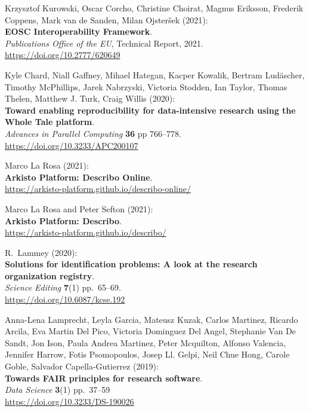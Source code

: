 Krzysztof Kurowski, Oscar Corcho, Christine Choirat, Magnus
Eriksson, Frederik Coppens, Mark van de Sanden, Milan Ojsteršek
(2021):\\
\textbf{EOSC Interoperability Framework}.\\
\emph{Publications Office of the EU}, Technical Report, 2021.\\
\url{https://doi.org/10.2777/620649}

Kyle Chard, Niall Gaffney, Mihael Hategan, Kacper Kowalik,
Bertram Ludäscher, Timothy McPhillips, Jarek Nabrzyski, Victoria
Stodden, Ian Taylor, Thomas Thelen, Matthew J. Turk, Craig Willis
(2020):\\
\textbf{Toward enabling reproducibility for data-intensive research
using the Whole Tale platform}.\\
\emph{Advances in Parallel Computing} \textbf{36} pp 766--778.\\
\url{https://doi.org/10.3233/APC200107}

Marco La Rosa (2021):\\
\textbf{Arkisto Platform: Describo Online}.\\
\url{https://arkisto-platform.github.io/describo-online/}

Marco La Rosa and Peter Sefton (2021):\\
\textbf{Arkisto Platform: Describo}.\\
\url{https://arkisto-platform.github.io/describo/}

R.~Lammey (2020):\\
\textbf{Solutions for identification problems: A look at the research
organization registry}.\\
\emph{Science Editing} \textbf{7}(1) pp.~65--69.\\
\url{https://doi.org/10.6087/kcse.192}

Anna-Lena Lamprecht, Leyla Garcia, Mateusz Kuzak, Carlos
Martinez, Ricardo Arcila, Eva Martin Del Pico, Victoria Dominguez Del
Angel, Stephanie Van De Sandt, Jon Ison, Paula Andrea Martinez, Peter
Mcquilton, Alfonso Valencia, Jennifer Harrow, Fotis Psomopoulos, Josep
Ll. Gelpi, Neil Chue Hong, Carole Goble, Salvador Capella-Gutierrez
(2019):\\
\textbf{Towards FAIR principles for research software}.\\
\emph{Data Science} \textbf{3}(1) pp.~37--59\\
\url{https://doi.org/10.3233/DS-190026}

